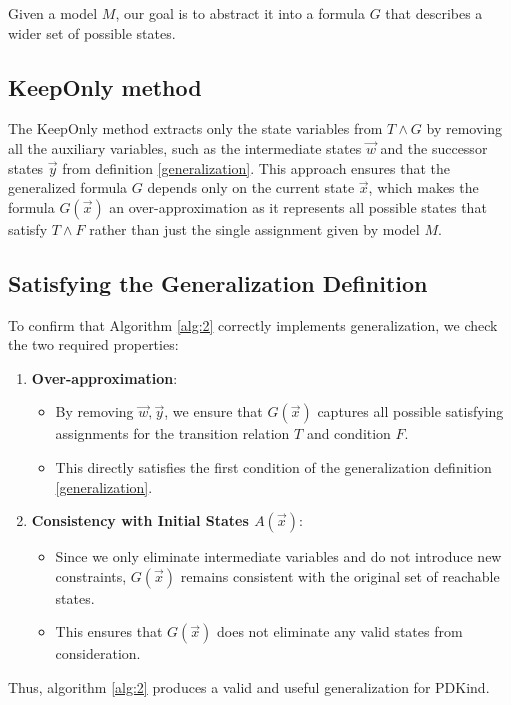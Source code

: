 Given a model $M$, our goal is to abstract it into a formula $G$ that describes a wider set of possible states.

\subsection*{KeepOnly method}
\noindent The KeepOnly method extracts only the state variables from $T \land G$ by removing all the auxiliary variables, such as the intermediate states $\vec{w}$ and the successor states $\vec{y}$ from definition \ref{generalization}. This approach ensures that the generalized formula $G$ depends only on the current state $\vec{x}$, which makes the formula $G(\vec{x})$ an over-approximation as it represents all possible states that satisfy $T \land F$ rather than just the single assignment given by model $M$.

\subsection*{Satisfying the Generalization Definition}
\noindent To confirm that Algorithm \ref{alg:2} correctly implements generalization, we check the two required properties:

\newpage
\begin{enumerate}
    \item\textbf{Over-approximation}:
    \begin{itemize}
        \item By removing $\vec{w}, \vec{y}$, we ensure that $G(\vec{x})$ captures all possible satisfying assignments for the transition relation $T$ and condition $F$.
        \item This directly satisfies the first condition of the generalization definition \ref{generalization}.
    \end{itemize}
    \item\textbf{Consistency with Initial States $A(\vec{x})$}:
    \begin{itemize}
        \item Since we only eliminate intermediate variables and do not introduce new constraints, $G(\vec{x})$ remains consistent with the original set of reachable states.
        \item This ensures that $G(\vec{x})$ does not eliminate any valid states from consideration.
    \end{itemize}
\end{enumerate}
Thus, algorithm \ref{alg:2} produces a valid and useful generalization for PDKind.

